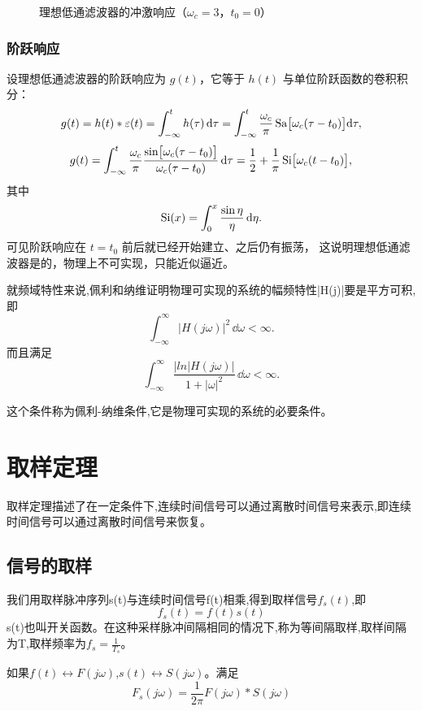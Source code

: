 \begin{figure}[htbp]
\centering
{}
\caption{理想低通滤波器的冲激响应（$\omega_c=3$，$t_0=0$）}
\end{figure}

\subsubsection{阶跃响应}

设理想低通滤波器的阶跃响应为 $g(t)$，它等于 $h(t)$ 与单位阶跃函数的卷积积分：
\[
    g(t)=h(t)*\varepsilon(t)=\int_{-\infty}^{t}h(\tau)\,\mathrm{d}\tau
    =\int_{-\infty}^{t}\frac{\omega_c}{\pi}\operatorname{Sa}\bigl[\omega_c(\tau-t_0)\bigr]\mathrm{d}\tau,
\]
\[
    g(t)=\int_{-\infty}^{t}\frac{\omega_c}{\pi}
    \frac{\sin\bigl[\omega_c(\tau-t_0)\bigr]}{\omega_c(\tau-t_0)}\,\mathrm{d}\tau
    =\frac{1}{2}+\frac{1}{\pi}\operatorname{Si}\bigl[\omega_c(t-t_0)\bigr],
\]
其中
\[
    \operatorname{Si}(x)=\int_0^{x}\frac{\sin\eta}{\eta}\,\mathrm{d}\eta .
\]
可见阶跃响应在 $t=t_0$ 前后就已经开始建立、之后仍有振荡，
这说明理想低通滤波器是的，物理上不可实现，只能近似逼近。\par
就频域特性来说,佩利和纳维证明物理可实现的系统的幅频特性|H(j\omega)|要是平方可积,即
\[
    \int_{-\infty}^{\infty}|H(j\omega)|^2\,\dd\omega<\infty.
\]
而且满足
\[
\int_{-\infty}^{\infty}\frac{{|ln|H(j\omega)|}}{1+|\omega|^2}\,\dd\omega<\infty.
\]\par
\qquad   这个条件称为佩利-纳维条件,它是物理可实现的系统的必要条件。
\section{取样定理}
\qquad 取样定理描述了在一定条件下,连续时间信号可以通过离散时间信号来表示,即连续时间信号可以通过离散时间信号来恢复。
\subsection{信号的取样}
我们用取样脉冲序列s(t)与连续时间信号f(t)相乘,得到取样信号$f_s(t)$,即
\[
f_s(t)=f(t)s(t)
\]
s(t)也叫开关函数。在这种采样脉冲间隔相同的情况下,称为等间隔取样,取样间隔为T,取样频率为$f_s=\frac{1}{T_s}$。\par
如果$f(t)\leftrightarrow F(j\omega)$,$s(t)\leftrightarrow S(j\omega)$。满足 
\[
F_s(j\omega)=\frac{1}{2\pi}F(j\omega)*S(j\omega)
\]
